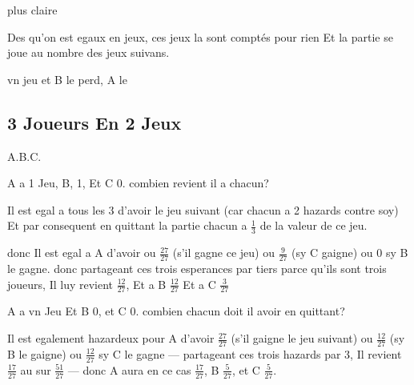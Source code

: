 \documentclass[11pt,a4paper]{article}
\begin{document}
 plus claire

Des qu'on est egaux en jeux, ces jeux la sont comptés pour rien Et la partie se joue au nombre des jeux suivans.

\ill{} vn jeu \ill{} et B le perd, \ill{} A le \ill{}


\subsection*{3 Joueurs En 2 Jeux}

A.B.C.

A a 1 Jeu, B, 1, Et C 0. combien revient il a chacun?

Il est egal a  tous les 3 d'avoir le jeu suivant (car chacun a 2 hazards contre soy) Et par consequent en quittant la partie chacun a $\frac{1}{3}$ de la valeur de ce jeu.

donc Il est egal a A d'avoir ou $\frac{27}{27}$ (s'il gagne ce jeu) ou $\frac{9}{27}$ (sy C gaigne) ou 0 sy B le gagne. donc partageant ces trois esperances par tiers parce qu'ils sont trois joueurs, Il luy revient $\frac{12}{27}$, Et a B $\frac{12}{27}$ Et a C $\frac{3}{27}$

A a vn Jeu Et B 0, et C 0. combien chacun doit il avoir en quittant?

Il est egalement hazardeux pour A d'avoir $\frac{27}{27}$ (s'il gaigne le jeu suivant) ou $\frac{12}{27}$ (sy B le gaigne) ou $\frac{12}{27}$ sy C le gagne — partageant ces trois hazards par 3, Il revient $\frac{17}{27}$ au  sur $\frac{51}{27}$ — donc A aura en ce cas $\frac{17}{27}$, B $\frac{5}{27}$, et C $\frac{5}{27}$.
\end{document}
